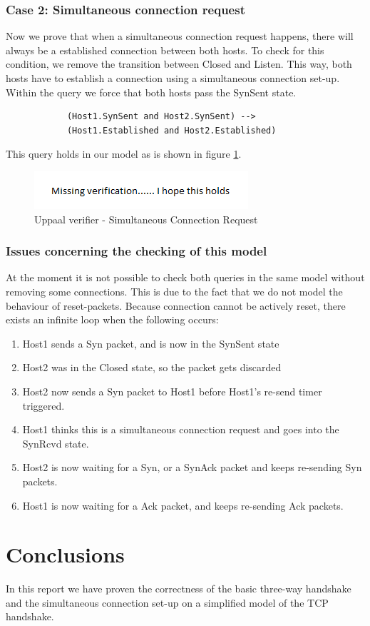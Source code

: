 \documentclass[twocolumn]{article}
\begin{document}
		\subsubsection{Case 2: Simultaneous connection request}
		Now we prove that when a simultaneous connection request happens, there will always be a established connection between both hosts. To check for this condition, we remove the transition between Closed and Listen. This way, both hosts have to establish a connection using a simultaneous connection set-up. Within the query we force that both hosts pass the SynSent state.
		\begin{verbatim}
			(Host1.SynSent and Host2.SynSent) -->
			(Host1.Established and Host2.Established)
		\end{verbatim}
		This query holds in our model as is shown in figure \ref{fig:verifier3}.
		\begin{figure}[h!]
			\begin{center}
				\includegraphics[width=\linewidth]{verifier-simul.png}
			\end{center}
			\caption{Uppaal verifier - Simultaneous Connection Request}
			\label{fig:verifier3}
		\end{figure}
		
		\subsubsection{Issues concerning the checking of this model}
		At the moment it is not possible to check both queries in the same model without removing some connections. This is due to the fact that we do not model the behaviour of reset-packets. Because connection cannot be actively reset, there exists an infinite loop when the following occurs:
		\begin{enumerate}
			\item Host1 sends a Syn packet, and is now in the SynSent state
			\item Host2 was in the Closed state, so the packet gets discarded
			\item Host2 now sends a Syn packet to Host1 before Host1's re-send timer triggered.
			\item Host1 thinks this is a simultaneous connection request and goes into the SynRcvd state. 
			\item Host2 is now waiting for a Syn, or a SynAck packet and keeps re-sending Syn packets.
			\item Host1 is now waiting for a Ack packet, and keeps re-sending Ack packets.
		\end{enumerate}
	

\section{Conclusions}
		In this report we have proven the correctness of the basic three-way handshake and the simultaneous connection set-up on a simplified model of the TCP handshake.
\end{document}
